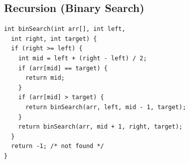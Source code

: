 \subsection*{Recursion (Binary Search)}
\begin{verbatim}
int binSearch(int arr[], int left,
  int right, int target) {
  if (right >= left) {
    int mid = left + (right - left) / 2;
    if (arr[mid] == target) {
      return mid;
    }
    if (arr[mid] > target) {
      return binSearch(arr, left, mid - 1, target);
    }
    return binSearch(arr, mid + 1, right, target);
  }
  return -1; /* not found */
}
\end{verbatim}
\vspace*{-1.25\baselineskip}
